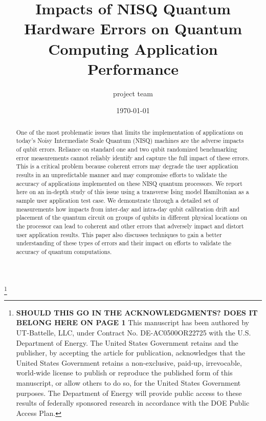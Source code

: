 \documentclass[aps,pra,reprint,showpacs,nofootinbib,superscriptaddress]{revtex4-1}
\begin{document}
\title {Impacts of NISQ Quantum Hardware Errors on Quantum Computing Application Performance}

%
{\footnote{ \textbf{SHOULD THIS GO IN THE ACKNOWLEDGMENTS? DOES IT BELONG HERE ON PAGE 1} This manuscript has been authored by UT-Battelle, LLC, under Contract No. DE-AC0500OR22725 with the U.S. Department of Energy. The United States Government retains and the publisher, by accepting the article for publication, acknowledges that the United States Government retains a non-exclusive, paid-up, irrevocable, world-wide license to publish or reproduce the published form of this manuscript, or allow others to do so, for the United States Government purposes. The Department of Energy will provide public access to these results of federally sponsored research in accordance with the DOE Public Access Plan.}}

\author{project team}








\date{\today}

\begin{abstract}
 One of the most problematic issues that limits the implementation of applications on today’s Noisy Intermediate Scale Quantum (NISQ) machines are the adverse impacts of qubit errors.  Reliance on standard one and two qubit randomized benchmarking error measurements cannot reliably identify and capture the full impact of these errors.  This is a critical problem because coherent errors may degrade the user application results in an unpredictable manner and may compromise efforts to validate the accuracy of applications implemented on these NISQ quantum processors.  We report here on an in-depth study of this issue using a transverse Ising model Hamiltonian as a sample user application test case.  We demonstrate through a detailed set of measurements how impacts from inter-day and intra-day qubit calibration drift and placement of the quantum circuit on groups of qubits in different physical locations on the processor can lead to coherent and other errors that adversely impact and distort user application results.  This paper also discusses techniques to gain a better understanding of these types of errors and their impact on efforts to validate the accuracy of quantum computations.
\end{abstract}
\end{document}
